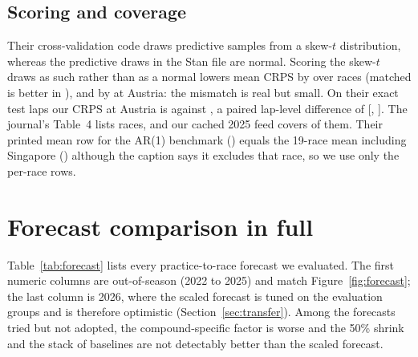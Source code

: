 \begin{table}[t]
\centering\small

\caption{Italic rows are panel headings. Head-to-head with Cappello and Hoegh on the \BenchNRaces{} races of their Table~4 that our 2025 feed covers. Entries are means over races of the per-race score (CRPS in s, RMSPE in s), lower being better. The difference is ours minus theirs, so positive means ours is worse, with a 95\% bootstrap interval over races; races won counts races where our score is lower; the sign test is two-sided.}
\label{tab:bench}
\end{table}

\subsection{Scoring and coverage}

Their cross-validation code draws predictive samples from a skew-$t$ distribution, whereas the predictive draws in the Stan file are normal.
Scoring the skew-$t$ draws as such rather than as a normal lowers mean CRPS by \SkewTDelta{} over \SkewTRaces{} races (matched is better in \SkewTBetter), and by \SkewTAustriaDelta{} at Austria: the mismatch is real but small.
On their exact test laps our CRPS at Austria is \AustriaCRPSOurs{} against \AustriaCRPSTheirs{}, a paired lap-level difference of \AustriaDiff{} [\AustriaDiffLo, \AustriaDiffHi].
The journal's Table~4 lists \JournalRacesTotal{} races, and our cached 2025 feed covers \JournalRacesScored{} of them.
Their printed mean row for the AR(1) benchmark (\JournalPrintedMeanAR) equals the 19-race mean including Singapore (\JournalMeanARAll) although the caption says it excludes that race, so we use only the per-race rows.

\section{Forecast comparison in full}\label{app:forecast}

Table~\ref{tab:forecast} lists every practice-to-race forecast we evaluated.
The first numeric columns are out-of-season (2022 to 2025) and match Figure~\ref{fig:forecast}; the last column is 2026, where the scaled forecast is tuned on the evaluation groups and is therefore optimistic (Section~\ref{sec:transfer}).
Among the forecasts tried but not adopted, the compound-specific factor is worse and the 50\% shrink and the stack of baselines are not detectably better than the scaled forecast.

\begin{table}[t]
\centering\footnotesize

\caption{Practice-to-race forecasts of the race degradation rate. Italic rows are panel headings. The first three numeric columns are out-of-season (2022--2025) mean absolute error (s/lap) with a 95\% weekend-bootstrap interval and the paired difference to the scaled forecast (positive favours the scaled forecast); the last column is the 2026 error, where the scaled forecast is tuned on the evaluation groups. Forecasts under ``Tried, not adopted'' were evaluated but not adopted.}
\label{tab:forecast}
\end{table}
